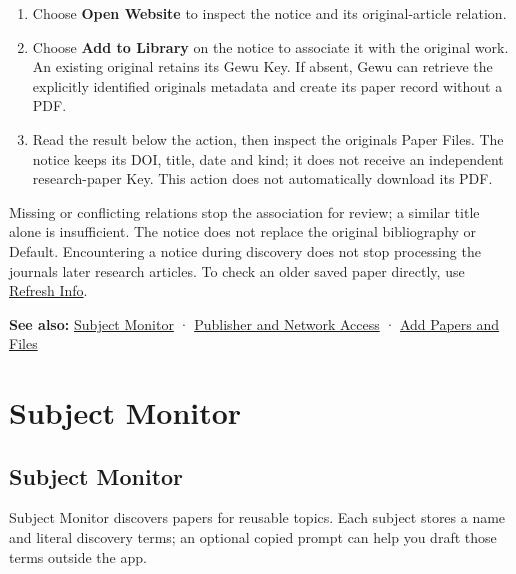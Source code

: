 \documentclass[10pt,letterpaper,oneside]{scrreprt}
\providecommand{\tightlist}{\setlength{\itemsep}{1pt}\setlength{\parskip}{0pt}}
\newenvironment{GewuRelated}{\par\nobreak\vspace{3pt}\nobreak\begingroup\small\sffamily\begin{samepage}\noindent}{\par\end{samepage}\endgroup}
\newenvironment{GewuLead}
  {\begin{list}{}{\leftmargin=0pt\rightmargin=0pt\topsep=0pt\partopsep=0pt\parsep=0pt}\item\relax
    \sffamily\fontsize{10.5}{13.2}\selectfont\color{GewuMuted}}
  {\end{list}}
\begin{document}
\begin{enumerate}
\tightlist
\item
  Choose \textbf{Open Website} to inspect the notice and its original-article relation.
\item
  Choose \textbf{Add to Library} on the notice to associate it with the original work. An existing original retains its Gewu Key. If absent, Gewu can retrieve the explicitly identified original\textquotesingle s metadata and create its paper record without a PDF.
\item
  Read the result below the action, then inspect the original\textquotesingle s Paper Files. The notice keeps its DOI, title, date and kind; it does not receive an independent research-paper Key. This action does not automatically download its PDF.
\end{enumerate}

Missing or conflicting relations stop the association for review; a similar title alone is insufficient. The notice does not replace the original bibliography or Default. Encountering a notice during discovery does not stop processing the journal\textquotesingle s later research articles. To check an older saved paper directly, use \hyperref[paper-publication-updates]{Refresh Info}.

\begin{GewuRelated}
\textbf{See also:} \hyperref[subject-monitor]{Subject Monitor} · \hyperref[network-access]{Publisher and Network Access} · \hyperref[import-files]{Add Papers and Files}
\end{GewuRelated}

\chapter{Subject Monitor}\label{chapter-16}

\section{Subject Monitor}\label{subject-monitor}

\begin{GewuLead}
Subject Monitor discovers papers for reusable topics. Each subject stores a name and literal discovery terms; an optional copied prompt can help you draft those terms outside the app.
\end{GewuLead}
\end{document}
